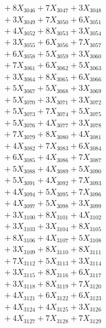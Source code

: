 \documentclass[a4paper,10pt]{article}
\begin{document}
{\begin{align}
&\;  + 8 X_{3046} + 7 X_{3047} + 3 X_{3048} \\[0.3ex]
&\;  + 3 X_{3049} + 7 X_{3050} + 6 X_{3051} \\[0.3ex]
&\;  + 4 X_{3052} + 8 X_{3053} + 3 X_{3054} \\[0.3ex]
&\;  + 3 X_{3055} + 6 X_{3056} + 7 X_{3057} \\[0.3ex]
&\;  + 6 X_{3058} + 5 X_{3059} + 3 X_{3060} \\[0.3ex]
&\;  + 7 X_{3061} + 6 X_{3062} + 5 X_{3063} \\[0.3ex]
&\;  + 3 X_{3064} + 8 X_{3065} + 6 X_{3066} \\[0.3ex]
&\;  + 5 X_{3067} + 5 X_{3068} + 3 X_{3069} \\[0.5ex]\allowbreak
&\;  + 5 X_{3070} + 3 X_{3071} + 3 X_{3072} \\[0.3ex]
&\;  + 5 X_{3073} + 7 X_{3074} + 5 X_{3075} \\[0.3ex]
&\;  + 5 X_{3076} + 4 X_{3077} + 3 X_{3078} \\[0.3ex]
&\;  + 7 X_{3079} + 8 X_{3080} + 4 X_{3081} \\[0.3ex]
&\;  + 4 X_{3082} + 7 X_{3083} + 6 X_{3084} \\[0.3ex]
&\;  + 6 X_{3085} + 4 X_{3086} + 7 X_{3087} \\[0.3ex]
&\;  + 5 X_{3088} + 4 X_{3089} + 5 X_{3090} \\[0.3ex]
&\;  + 5 X_{3091} + 4 X_{3092} + 7 X_{3093} \\[0.3ex]
&\;  + 4 X_{3094} + 5 X_{3095} + 7 X_{3096} \\[0.3ex]
&\;  + 4 X_{3097} + 5 X_{3098} + 3 X_{3099} \\[0.5ex]\allowbreak
&\;  + 3 X_{3100} + 8 X_{3101} + 4 X_{3102} \\[0.3ex]
&\;  + 3 X_{3103} + 3 X_{3104} + 8 X_{3105} \\[0.3ex]
&\;  + 8 X_{3106} + 4 X_{3107} + 5 X_{3108} \\[0.3ex]
&\;  + 3 X_{3109} + 8 X_{3110} + 8 X_{3111} \\[0.3ex]
&\;  + 7 X_{3112} + 5 X_{3113} + 3 X_{3114} \\[0.3ex]
&\;  + 3 X_{3115} + 8 X_{3116} + 6 X_{3117} \\[0.3ex]
&\;  + 3 X_{3118} + 8 X_{3119} + 7 X_{3120} \\[0.3ex]
&\;  + 4 X_{3121} + 6 X_{3122} + 6 X_{3123} \\[0.3ex]
&\;  + 4 X_{3124} + 4 X_{3125} + 3 X_{3126} \\[0.3ex]
&\;  + 4 X_{3127} + 7 X_{3128} + 7 X_{3129} \\[0.5ex]\allowbreak

\end{align}}
\end{document}
